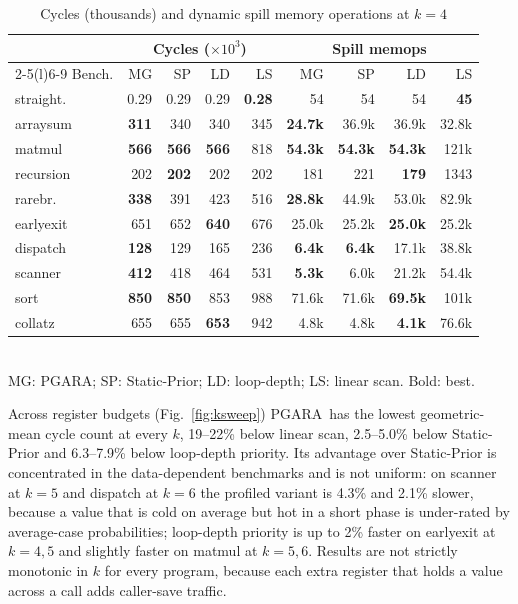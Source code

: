 \documentclass[conference]{IEEEtran}
\newcommand{\MG}{PGARA}
\begin{document}
\begin{table}[t]
\centering
\caption{Cycles (thousands) and dynamic spill memory operations at $k=4$}
\label{tab:k4}
\footnotesize
\setlength{\tabcolsep}{2.6pt}
\begin{tabular}{@{}lrrrr@{\hspace{6pt}}rrrr@{}}
\toprule
& \multicolumn{4}{c}{Cycles ($\times10^3$)} & \multicolumn{4}{c}{Spill memops} \\
\cmidrule(lr){2-5}\cmidrule(l){6-9}
Bench. & MG & SP & LD & LS & MG & SP & LD & LS \\
\midrule
straight. & 0.29 & 0.29 & 0.29 & \textbf{0.28} & 54 & 54 & 54 & \textbf{45} \\
arraysum & \textbf{311} & 340 & 340 & 345 & \textbf{24.7k} & 36.9k & 36.9k & 32.8k \\
matmul & \textbf{566} & \textbf{566} & \textbf{566} & 818 & \textbf{54.3k} & \textbf{54.3k} & \textbf{54.3k} & 121k \\
recursion & 202 & \textbf{202} & 202 & 202 & 181 & 221 & \textbf{179} & 1343 \\
rarebr. & \textbf{338} & 391 & 423 & 516 & \textbf{28.8k} & 44.9k & 53.0k & 82.9k \\
earlyexit & 651 & 652 & \textbf{640} & 676 & 25.0k & 25.2k & \textbf{25.0k} & 25.2k \\
dispatch & \textbf{128} & 129 & 165 & 236 & \textbf{6.4k} & \textbf{6.4k} & 17.1k & 38.8k \\
scanner & \textbf{412} & 418 & 464 & 531 & \textbf{5.3k} & 6.0k & 21.2k & 54.4k \\
sort & \textbf{850} & \textbf{850} & 853 & 988 & 71.6k & 71.6k & \textbf{69.5k} & 101k \\
collatz & 655 & 655 & \textbf{653} & 942 & 4.8k & 4.8k & \textbf{4.1k} & 76.6k \\
\bottomrule
\end{tabular}\\[2pt]
{\scriptsize MG: \MG; SP: Static-Prior; LD: loop-depth; LS: linear scan. Bold: best.}
\end{table}

Across register budgets (Fig.~\ref{fig:ksweep}) \MG\ has the lowest
geometric-mean cycle count at every $k$, 19--22\% below linear scan,
2.5--5.0\% below Static-Prior and 6.3--7.9\% below loop-depth priority.
Its advantage over Static-Prior is concentrated in the data-dependent
benchmarks and is not uniform: on scanner at $k=5$ and dispatch at
$k=6$ the profiled variant is 4.3\% and 2.1\% slower, because a value
that is cold on average but hot in a short phase is under-rated by
average-case probabilities; loop-depth priority is up to 2\% faster
on earlyexit at $k=4,5$ and slightly faster on matmul at $k=5,6$. Results are not strictly monotonic in $k$
for every program, because each extra register that holds a value
across a call adds caller-save traffic.
\end{document}
